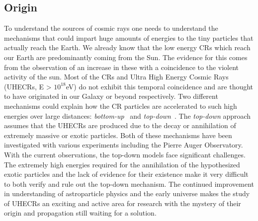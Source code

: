 \subsection{Origin}
\label{subsec:crorig}
To understand the sources of cosmic rays one needs to understand the mechanisms that could impart huge amounts of energies to the tiny particles that actually reach the Earth. We already know that the low energy CRs which reach our Earth are predominantly coming from the Sun. The evidence for this comes from the observation of an increase in these with a coincidence to the violent activity of the sun. Most of the CRs and Ultra High Energy Cosmic Rays (UHECRs, E > $10^{18}$eV) do not exhibit this temporal coincidence and are thought to have originated in our Galaxy or beyond respectively. Two different mechanisms could explain how the CR particles are accelerated to such high energies over large distances: \textit{bottom-up}~\cite{1984ARA&A..22..425H,Blandford_2000,1993A&A...272..161R} and \textit{top-down}~\cite{Bhattacharjee_2000,Busca_2006}. The \textit{top-down} approach assumes that the UHECRs are produced due to the decay or annihilation of extremely massive or exotic particles.
Both of these mechanisms have been investigated with various experiments including the Pierre Auger Observatory. With the current observations, the top-down models face significant challenges. The extremely high energies required for the annihilation of the hypothesized exotic particles and the lack of evidence for their existence make it very difficult to both verify and rule out the top-down mechanism. The continued improvement in understanding of astroparticle physics and the early universe makes the study of UHECRs an exciting and active area for research with the mystery of their origin and propagation still waiting for a solution. 

